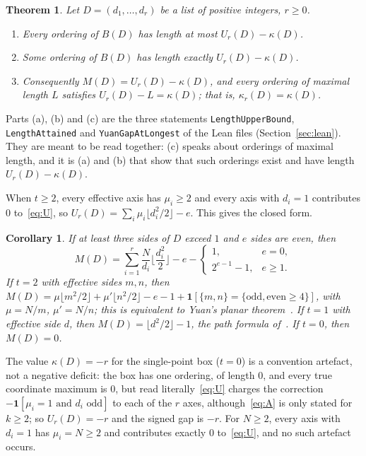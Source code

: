\documentclass[11pt]{article}
\newtheorem{theorem}{Theorem}
\newtheorem{corollary}{Corollary}
\theoremstyle{remark}
\newcommand{\ind}{\mathbf 1}
\begin{document}
\begin{theorem}\label{thm:main}
Let $D=(d_1,\dots,d_r)$ be a list of positive integers, $r\ge0$.
\begin{enumerate}
\item[(a)] Every ordering of $B(D)$ has length at most $U_r(D)-\kappa(D)$.
\item[(b)] Some ordering of $B(D)$ has length exactly $U_r(D)-\kappa(D)$.
\item[(c)] Consequently $M(D)=U_r(D)-\kappa(D)$, and every ordering of maximal
length $L$ satisfies $U_r(D)-L=\kappa(D)$; that is, $\kappa_r(D)=\kappa(D)$.
\end{enumerate}
\end{theorem}

Parts (a), (b) and (c) are the three statements \texttt{LengthUpperBound},
\texttt{LengthAttained} and \texttt{YuanGapAtLongest} of the Lean files
(Section~\ref{sec:lean}). They are meant to be read together: (c) speaks about
orderings of maximal length, and it is (a) and (b) that show that such
orderings exist and have length $U_r(D)-\kappa(D)$.

When $t\ge2$, every effective axis has $\mu_i\ge2$ and every axis with
$d_i=1$ contributes $0$ to~\eqref{eq:U}, so $U_r(D)=\sum_i\mu_i\lfloor
d_i^2/2\rfloor-e$. This gives the closed form.

\begin{corollary}\label{cor:closed}
If at least three sides of $D$ exceed $1$ and $e$ sides are even, then
\[
M(D)=\sum_{i=1}^r\frac{N}{d_i}\Big\lfloor\frac{d_i^2}{2}\Big\rfloor-e-
\begin{cases}1,&e=0,\\ 2^{e-1}-1,&e\ge1.\end{cases}
\]
If $t=2$ with effective sides $m,n$, then $M(D)=\mu\lfloor m^2/2\rfloor+
\mu'\lfloor n^2/2\rfloor-e-1+\ind[\{m,n\}=\{\text{odd},\text{even}\ge4\}]$,
with $\mu=N/m$, $\mu'=N/n$; this is equivalent to Yuan's planar
theorem~\cite[Theorem~1.1]{yuan}. If $t=1$ with
effective side $d$, then $M(D)=\lfloor d^2/2\rfloor-1$, the path formula
of~\cite{bgv}. If $t=0$, then $M(D)=0$.
\end{corollary}

The value $\kappa(D)=-r$ for the single-point box ($t=0$) is a convention
artefact, not a negative deficit: the box has one ordering, of length $0$, and
every true coordinate maximum is $0$, but read literally~\eqref{eq:U} charges
the correction $-\ind[\mu_i=1\text{ and }d_i\text{ odd}]$ to each of the $r$
axes, although~\eqref{eq:A} is only stated for $k\ge2$; so $U_r(D)=-r$ and the
signed gap is $-r$. For $N\ge2$, every axis with $d_i=1$ has $\mu_i=N\ge2$ and
contributes exactly $0$ to~\eqref{eq:U}, and no such artefact occurs.
\end{document}
